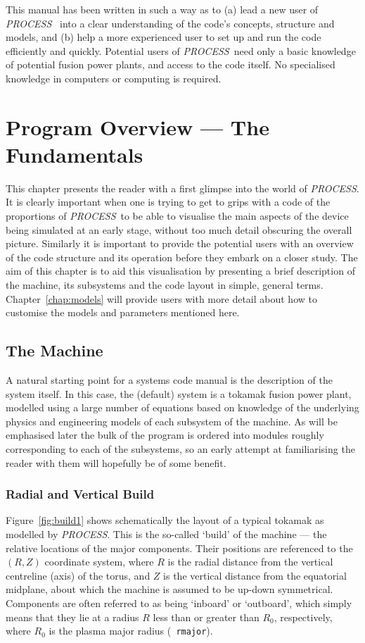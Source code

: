 \documentclass[11pt,a4paper]{report}
\makeatletter
\newcommand{\PS}{\mbox{\it PROCESS\/ }}
\newcommand{\PSD}{\mbox{\it PROCESS}\@.\/ }
\newcommand{\setheader}[1]
 {\markright{\rlap{\lower0.8ex\hbox to\textwidth{\hrulefill}}{\bf#1}}}
\newcommand{\mychapter}[1]{\small\normalsize
 \setcounter{footnote}{0}
 \chapter{#1}
 \pagestyle{myheadings}
 \setheader{Chapter \thechapter\hspace{0.8em}#1}}
\makeatother
\begin{document}
This manual has been written in such a way as to (a) lead a new user of \PS
into a clear understanding of the code's concepts, structure and models, and
(b) help a more experienced user to set up and run the code efficiently and
quickly. Potential users of \PS need only a basic knowledge of potential
fusion power plants, and access to the code itself. No specialised knowledge
in computers or computing is required.

\mychapter{Program Overview --- The Fundamentals}
\label{chap:overview}

This chapter presents the reader with a first glimpse into the world of \PSD
It is clearly important when one is trying to get to grips with a code of the
proportions of \PS to be able to visualise the main aspects of the device
being simulated at an early stage, without too much detail obscuring the
overall picture. Similarly it is important to provide the potential users with
an overview of the code structure and its operation before they embark on a
closer study. The aim of this chapter is to aid this visualisation by
presenting a brief description of the machine, its subsystems and the code
layout in simple, general terms. Chapter~\ref{chap:models} will provide users
with more detail about how to customise the models and parameters mentioned
here.

\section{The Machine}

A natural starting point for a systems code manual is the description of the
system itself. In this case, the (default) system is a tokamak fusion power
plant, modelled using a large number of equations based on knowledge of the
underlying physics and engineering models of each subsystem of the machine. As
will be emphasised later the bulk of the program is ordered into modules
roughly corresponding to each of the subsystems, so an early attempt at
familiarising the reader with them will hopefully be of some benefit.

\subsection{Radial and Vertical Build}
Figure~\ref{fig:build1} shows schematically the layout of a typical tokamak as
modelled by \PSD This is the so-called `build' of the machine --- the relative
locations of the major components. Their positions are referenced to the
$(R,Z)$ coordinate system, where $R$ is the radial distance from the vertical
centreline (axis) of the torus, and $Z$ is the vertical distance from the
equatorial midplane, about which the machine is assumed to be up-down
symmetrical. Components are often referred to as being `inboard' or
`outboard', which simply means that they lie at a radius $R$ less than or
greater than $R_0$, respectively, where $R_0$ is the plasma major radius ({\tt
rmajor}).
\end{document}
